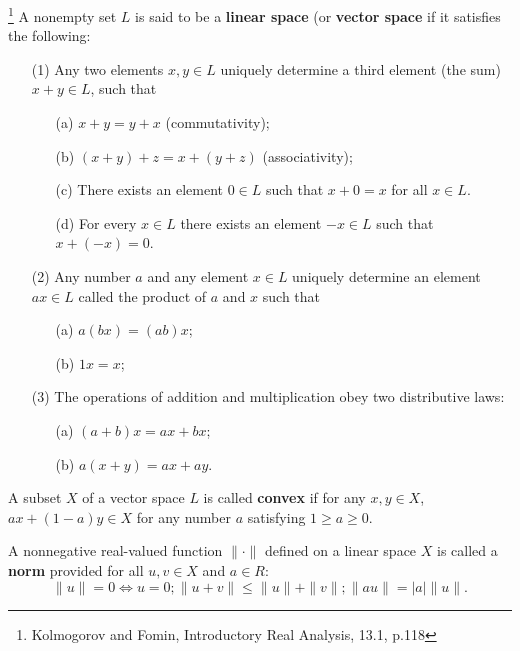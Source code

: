 \begin{definition}
\footnote{Kolmogorov and Fomin, Introductory Real Analysis, 13.1, p.118}
A nonempty set $L$ is said to be a \textbf{linear space} 
(or 
\textbf{vector space}
if it satisfies the following:
\begin{enumerate}
  \item[(1)] Any two elements $x,y\in L$ uniquely determine a third element (the
      sum) $x+y\in L$, such that
    \begin{enumerate}
      \item[(a)] $x+y=y+x$ (commutativity);
      \item[(b)] $(x+y)+z=x+(y+z)$ (associativity);
      \item[(c)] There exists an element $0\in L$ such that $x+0=x$ for all
        $x\in L$.
      \item[(d)] For every $x\in L$ there exists an element $-x\in L$ such that
        $x+(-x)=0$.
    \end{enumerate}
  \item[(2)] Any number $a$ and any element $x\in L$ uniquely determine an
    element $ax\in L$ called the product of $a$ and $x$ such that
    \begin{enumerate}
      \item[(a)] $a(bx)=(ab)x$;
      \item[(b)] $1x=x$;
    \end{enumerate}
  \item[(3)] The operations of addition and multiplication obey two distributive
    laws:
    \begin{enumerate}
      \item[(a)] $(a+b)x=ax+bx$;
      \item[(b)] $a(x+y)=ax+ay$.
    \end{enumerate}
\end{enumerate}
\end{definition}

\begin{definition}
A subset $X$ of a vector space $L$ is called \textbf{convex}
if for any $x,y\in
X$, $ax+(1-a)y\in X$ for any number $a$ satisfying $1\geq a\geq 0$.
\end{definition}

\begin{definition}
A nonnegative real-valued function $\|\cdot\|$ defined on a linear space $X$ is
called a \textbf{norm}
provided for all $u,v\in X$ and $a\in R$:
\[
  \|u\|=0 \Leftrightarrow u=0;
  \|u+v\|\le \|u\| + \|v\|;
  \|au\|= |a| \|u\|.
\]
\end{definition}

